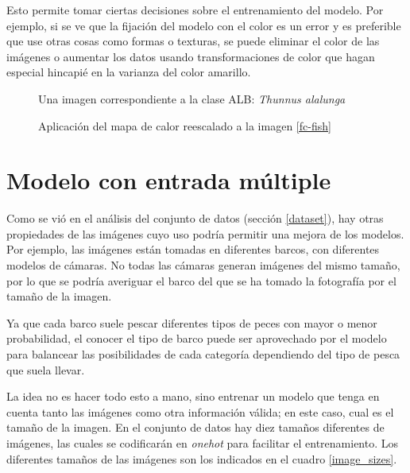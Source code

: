 Esto permite tomar ciertas decisiones sobre el entrenamiento del modelo. Por
ejemplo, si se ve que la fijación del modelo con el color es un error y es
preferible que use otras cosas como formas o texturas, se puede eliminar el
color de las imágenes o aumentar los datos usando transformaciones de color que
hagan especial hincapié en la varianza del color amarillo.

\begin{figure}
    \caption{Una imagen correspondiente a la clase ALB: \textit{Thunnus alalunga}}
\label{yft}
\end{figure}

\begin{figure}
    \caption{Aplicación del mapa de calor reescalado a la imagen \ref{fc-fish}}
\label{yft-heatmap}
\end{figure}

\section{Modelo con entrada múltiple}
\label{sec:multi_entry}

Como se vió en el análisis del conjunto de datos (sección \ref{dataset}), hay
otras propiedades de las imágenes cuyo uso podría permitir una mejora de los
modelos. Por ejemplo, las imágenes están tomadas en diferentes barcos, con
diferentes modelos de cámaras. No todas las cámaras generan imágenes del mismo
tamaño, por lo que se podría averiguar el barco del que se ha tomado la
fotografía por el tamaño de la imagen.

Ya que cada barco suele pescar diferentes tipos de peces con mayor o menor
probabilidad, el conocer el tipo de barco puede ser aprovechado por el modelo
para balancear las posibilidades de cada categoría dependiendo del tipo de
pesca que suela llevar.

La idea no es hacer todo esto a mano, sino entrenar un modelo que tenga en
cuenta tanto las imágenes como otra información válida; en este caso, cual es
el tamaño de la imagen. En el conjunto de datos hay diez tamaños diferentes de
imágenes, las cuales se codificarán en \textit{onehot} para facilitar el
entrenamiento.  Los diferentes tamaños de las imágenes son los indicados en el
cuadro \ref{image_sizes}.

